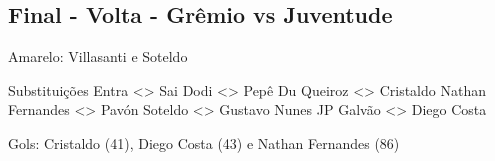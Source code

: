 \newpage
\subsection{Final - Volta - Grêmio vs Juventude}

\begin{figure}[H]
    \centering
    
\end{figure}

Amarelo: Villasanti e Soteldo

Substituições
Entra <> Sai
Dodi <> Pepê
Du Queiroz <> Cristaldo
Nathan Fernandes <> Pavón
Soteldo <> Gustavo Nunes
JP Galvão <> Diego Costa

Gols: Cristaldo (41), Diego Costa (43) e Nathan Fernandes (86)